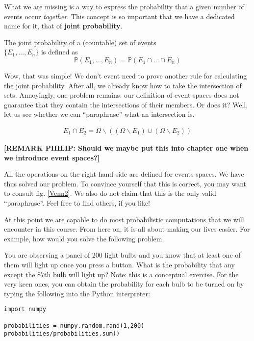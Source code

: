 \documentclass[a4paper,11pt,leqno]{report}
\begin{document}
What we are missing is a way to express the probability that a given number of events occur 
\textit{together}. This concept is so important that we have a dedicated name for it, that of 
\textbf{joint probability}.

\begin{Definition}{}
The joint probability of a (countable) set of events \\ $ \{E_{1}, \ldots, E_{n}\} $ is defined as
$$ \mathbb{P}(E_{1}, \ldots, E_{n}) = \mathbb{P}(E_{1} \cap \ldots \cap E_{n}) $$
\end{Definition}

Wow, that was simple! We don't event need to prove another rule for calculating the joint probability.
After all, we already know how to take the intersection of sets. Annoyingly, one problem remains: our
definition of event spaces does not guarantee that they contain the intersections of their members. Or does 
it? Well, let us see whether we can ``paraphrase'' what an intersection is.

\begin{align}
E_{1} \cap E_{2} = \Omega \backslash ((\Omega \backslash E_{1}) \cup (\Omega \backslash E_{2}))
\end{align}

\textbf{[REMARK PHILIP: Should we maybe put this into chapter one when we introduce event spaces?]}

All the operations on the right hand side are defined for events spaces. We have thus solved our problem.
To convince yourself that this is correct, you may want to consult fig. \ref{Venn2}. We also do not claim
that this is the only valid ``paraphrase''. Feel free to find others, if you like!

At this point we are capable to do most probabilistic computations that we will encounter in this course.
From here on, it is all about making our lives easier. For example, how would you solve the following 
problem.

\begin{Exercise}
You are observing a panel of 200 light bulbs and you know that at least one of them will light up once you 
press a button. What is the probability that any except the 87th bulb will light up? Note: this is a 
conceptual exercise. For the very keen ones, you can obtain the probability for each bulb to be turned on
by typing the following into the Python interpreter:

\begin{lstlisting}
import numpy

probabilities = numpy.random.rand(1,200)
probabilities/probabilities.sum()
\end{lstlisting} 
\end{Exercise}
\end{document}
